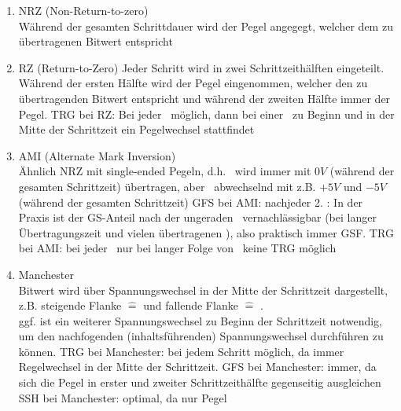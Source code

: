 \documentclass[10pt,a4paper]{scrartcl}
\begin{document}
\begin{enumerate}
	\item NRZ (Non-Return-to-zero)\\
		Während der gesamten Schrittdauer wird der Pegel angegegt, welcher dem zu übertragenen Bitwert entspricht
	\item RZ (Return-to-Zero)
		Jeder Schritt wird in zwei Schrittzeithälften eingeteilt. Während der ersten Hälfte wird der Pegel eingenommen, welcher den zu übertragenden Bitwert entspricht und während der zweiten Hälfte immer der \grqq\-Pegel.
		\subitem TRG bei RZ: Bei jeder \grqq\ möglich, dann bei einer \grqq\ zu Beginn und in der Mitte der Schrittzeit ein Pegelwechsel stattfindet
	\item AMI (Alternate Mark Inversion)\\
		Ähnlich NRZ mit single-ended Pegeln, d.h. \grqq\ wird immer mit $0V$ (während der gesamten Schrittzeit) übertragen, aber \grqq\ abwechselnd mit z.B. $+5V$ und $-5V$ (während der gesamten Schrittzeit)
		\subitem GFS bei AMI: nachjeder 2. \grqq: In der Praxis ist der GS-Anteil nach der ungeraden \grqq\ vernachlässigbar (bei langer Übertragungszeit und vielen übertragenen \grqq), also praktisch immer GSF.
		\subitem TRG bei AMI: bei jeder \grqq\ nur bei langer Folge von \grqq\ keine TRG möglich
	\item Manchester\\
		Bitwert wird über Spannungswechsel in der Mitte der Schrittzeit dargestellt, z.B. steigende Flanke $\hat{=}$ \grqq und fallende Flanke $\hat{=}$  \grqq.\\
		ggf. ist ein weiterer Spannungswechsel zu Beginn der Schrittzeit notwendig, um den nachfogenden (inhaltsführenden) Spannungswechsel durchführen zu können.
		\subitem TRG bei Manchester: bei jedem Schritt möglich, da immer Regelwechsel in der Mitte der Schrittzeit.
		\subitem GFS bei Manchester: immer, da sich die Pegel in erster und zweiter Schrittzeithälfte gegenseitig ausgleichen
		\subitem SSH bei Manchester: optimal, da \glqq nur  Pegel
\end{enumerate}
\end{document}
